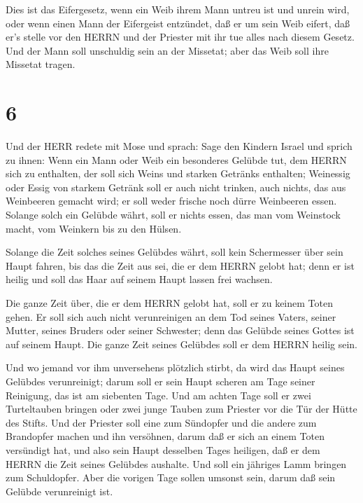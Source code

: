  Dies ist das Eifergesetz, wenn ein Weib ihrem Mann untreu
ist und unrein wird,  oder wenn einen Mann der Eifergeist
entzündet, daß er um sein Weib eifert, daß er's stelle vor den HERRN und
der Priester mit ihr tue alles nach diesem Gesetz.  Und der
Mann soll unschuldig sein an der Missetat; aber das Weib soll ihre
Missetat tragen.

\hypertarget{section-5}{%
\section{6}\label{section-5}}

 Und der HERR redete mit Mose und sprach:  Sage
den Kindern Israel und sprich zu ihnen: Wenn ein Mann oder Weib ein
besonderes Gelübde tut, dem HERRN sich zu enthalten,  der
soll sich Weins und starken Getränks enthalten; Weinessig oder Essig von
starkem Getränk soll er auch nicht trinken, auch nichts, das aus
Weinbeeren gemacht wird; er soll weder frische noch dürre Weinbeeren
essen.  Solange solch ein Gelübde währt, soll er nichts
essen, das man vom Weinstock macht, vom Weinkern bis zu den Hülsen.

 Solange die Zeit solches seines Gelübdes währt, soll kein
Schermesser über sein Haupt fahren, bis das die Zeit aus sei, die er dem
HERRN gelobt hat; denn er ist heilig und soll das Haar auf seinem Haupt
lassen frei wachsen.

 Die ganze Zeit über, die er dem HERRN gelobt hat, soll er
zu keinem Toten gehen.  Er soll sich auch nicht
verunreinigen an dem Tod seines Vaters, seiner Mutter, seines Bruders
oder seiner Schwester; denn das Gelübde seines Gottes ist auf seinem
Haupt.  Die ganze Zeit seines Gelübdes soll er dem HERRN
heilig sein.

 Und wo jemand vor ihm unversehens plötzlich stirbt, da wird
das Haupt seines Gelübdes verunreinigt; darum soll er sein Haupt scheren
am Tage seiner Reinigung, das ist am siebenten Tage.  Und
am achten Tage soll er zwei Turteltauben bringen oder zwei junge Tauben
zum Priester vor die Tür der Hütte des Stifts.  Und der
Priester soll eine zum Sündopfer und die andere zum Brandopfer machen
und ihn versöhnen, darum daß er sich an einem Toten versündigt hat, und
also sein Haupt desselben Tages heiligen,  daß er dem HERRN
die Zeit seines Gelübdes aushalte. Und soll ein jähriges Lamm bringen
zum Schuldopfer. Aber die vorigen Tage sollen umsonst sein, darum daß
sein Gelübde verunreinigt ist.

